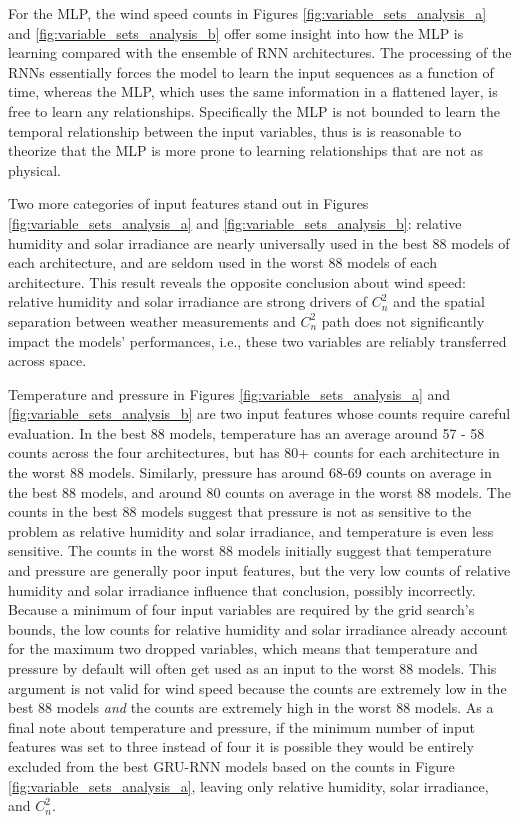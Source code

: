 For the \ac{MLP}, the wind speed counts in Figures \ref{fig:variable_sets_analysis_a} and \ref{fig:variable_sets_analysis_b} offer some insight into how the \ac{MLP} is learning compared with the ensemble of \ac{RNN} architectures. The processing of the \ac{RNN}s essentially forces the model to learn the input sequences as a function of time, whereas the \ac{MLP}, which uses the same information in a flattened layer, is free to learn any relationships. Specifically the \ac{MLP} is not bounded to learn the temporal relationship between the input variables, thus is is reasonable to theorize that the \ac{MLP} is more prone to learning relationships that are not as physical.

Two more categories of input features stand out in Figures \ref{fig:variable_sets_analysis_a} and \ref{fig:variable_sets_analysis_b}: relative humidity and solar irradiance are nearly universally used in the best 88 models of each architecture, and are seldom used in the worst 88 models of each architecture. This result reveals the opposite conclusion about wind speed: relative humidity and solar irradiance are strong drivers of $C_{n}^{2}$ and the spatial separation between weather measurements and $C_{n}^{2}$ path does not significantly impact the models' performances, i.e., these two variables are reliably transferred across space.

Temperature and pressure in Figures \ref{fig:variable_sets_analysis_a} and \ref{fig:variable_sets_analysis_b} are two input features whose counts require careful evaluation. In the best 88 models, temperature has an average around 57 - 58 counts across the four architectures, but has 80+ counts for each architecture in the worst 88 models. Similarly, pressure has around 68-69 counts on average in the best 88 models, and around 80 counts on average in the worst 88 models. The counts in the best 88 models suggest that pressure is not as sensitive to the problem as relative humidity and solar irradiance, and temperature is even less sensitive. The counts in the worst 88 models initially suggest that temperature and pressure are generally poor input features, but the very low counts of relative humidity and solar irradiance influence that conclusion, possibly incorrectly. Because a minimum of four input variables are required by the grid search's bounds, the low counts for relative humidity and solar irradiance already account for the maximum two dropped variables, which means that temperature and pressure by default will often get used as an input to the worst 88 models. This argument is not valid for wind speed because the counts are extremely low in the best 88 models \emph{and} the counts are extremely high in the worst 88 models. As a final note about temperature and pressure, if the minimum number of input features was set to three instead of four it is possible they would be entirely excluded from the best \ac{GRU-RNN} models based on the counts in Figure \ref{fig:variable_sets_analysis_a}, leaving only relative humidity, solar irradiance, and $C_{n}^{2}$. 


